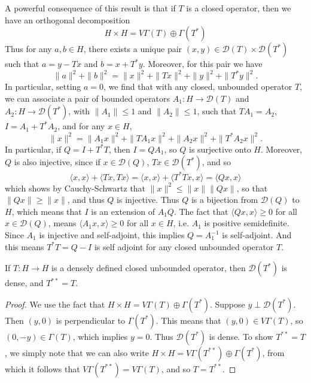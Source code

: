 A powerful consequence of this result is that if $T$ is a closed operator, then we have an orthogonal decomposition
%
\[ H \times H = V \Gamma(T) \oplus \Gamma(T^*) \]
%
Thus for any $a,b \in H$, there exists a unique pair $(x,y) \in \mathcal{D}(T) \times \mathcal{D}(T^*)$ such that $a = y - Tx$ and $b = x + T^* y$. Moreover, for this pair we have
%
\[ \| a \|^2 + \| b \|^2 = \| x \|^2 + \| Tx \|^2 + \| y \|^2 + \| T^* y \|^2. \]
%
In particular, setting $a = 0$, we find that with any closed, unbounded operator $T$, we can associate a pair of bounded operators $A_1: H \to \mathcal{D}(T)$ and $A_2: H \to \mathcal{D}(T^*)$, with $\| A_1 \| \leq 1$ and $\| A_2 \| \leq 1$, such that $TA_1 = A_2$, $I = A_1 + T^* A_2$, and for any $x \in H$,
%
\[ \| x \|^2 = \| A_1 x \|^2 + \| TA_1 x \|^2 + \| A_2 x \|^2 + \| T^* A_2 x \|^2. \]
%
In particular, if $Q = I + T^*T$, then $I = QA_1$, so $Q$ is surjective onto $H$. Moreover, $Q$ is also injective, since if $x \in \mathcal{D}(Q)$, $Tx \in \mathcal{D}(T^*)$, and so
%
\[ \langle x, x \rangle + \langle Tx, Tx \rangle = \langle x, x \rangle + \langle T^*Tx, x \rangle = \langle Qx, x \rangle \]
%
which shows by Cauchy-Schwartz that $\| x \|^2 \leq \| x \| \| Qx \|$, so that $\| Qx \| \geq \| x \|$, and thus $Q$ is injective. Thus $Q$ is a bijection from $\mathcal{D}(Q)$ to $H$, which means that $I$ is an extension of $A_1Q$. The fact that $\langle Qx, x \rangle \geq 0$ for all $x \in \mathcal{D}(Q)$, means $\langle A_1 x, x \rangle \geq 0$ for all $x \in H$, i.e. $A_1$ is positive semidefinite. Since $A_1$ is injective and self-adjoint, this implies $Q = A_1^{-1}$ is self-adjoint. And this means $T^*T = Q - I$ is self adjoint for any closed unbounded operator $T$.

\begin{theorem}
    If $T: H \to H$ is a densely defined closed unbounded operator, then $\mathcal{D}(T^*)$ is dense, and $T^{**} = T$.
\end{theorem}
\begin{proof}
    We use the fact that $H \times H = V \Gamma(T) \oplus \Gamma(T^*)$. Suppose $y \perp \mathcal{D}(T^*)$. Then $(y,0)$ is perpendicular to $\Gamma(T^*)$. This means that $(y,0) \in V \Gamma(T)$, so $(0,-y) \in \Gamma(T)$, which implies $y = 0$. Thus $\mathcal{D}(T^*)$ is dense. To show $T^{**} = T$, we simply note that we can also write $H \times H = V \Gamma(T^{**}) \oplus \Gamma(T^*)$, from which it follows that $V \Gamma(T^{**}) = V \Gamma(T)$, and so $T = T^{**}$.
\end{proof}


